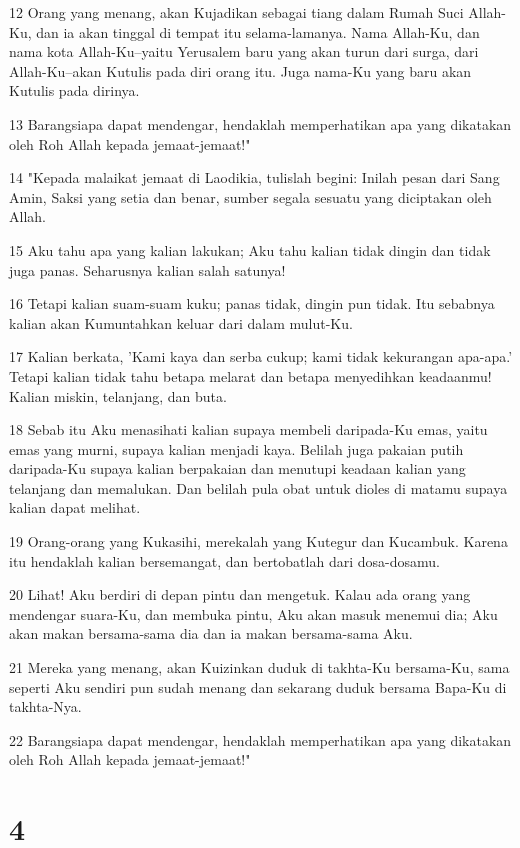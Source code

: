 \par 12 Orang yang menang, akan Kujadikan sebagai tiang dalam Rumah Suci Allah-Ku, dan ia akan tinggal di tempat itu selama-lamanya. Nama Allah-Ku, dan nama kota Allah-Ku--yaitu Yerusalem baru yang akan turun dari surga, dari Allah-Ku--akan Kutulis pada diri orang itu. Juga nama-Ku yang baru akan Kutulis pada dirinya.
\par 13 Barangsiapa dapat mendengar, hendaklah memperhatikan apa yang dikatakan oleh Roh Allah kepada jemaat-jemaat!"
\par 14 "Kepada malaikat jemaat di Laodikia, tulislah begini: Inilah pesan dari Sang Amin, Saksi yang setia dan benar, sumber segala sesuatu yang diciptakan oleh Allah.
\par 15 Aku tahu apa yang kalian lakukan; Aku tahu kalian tidak dingin dan tidak juga panas. Seharusnya kalian salah satunya!
\par 16 Tetapi kalian suam-suam kuku; panas tidak, dingin pun tidak. Itu sebabnya kalian akan Kumuntahkan keluar dari dalam mulut-Ku.
\par 17 Kalian berkata, 'Kami kaya dan serba cukup; kami tidak kekurangan apa-apa.' Tetapi kalian tidak tahu betapa melarat dan betapa menyedihkan keadaanmu! Kalian miskin, telanjang, dan buta.
\par 18 Sebab itu Aku menasihati kalian supaya membeli daripada-Ku emas, yaitu emas yang murni, supaya kalian menjadi kaya. Belilah juga pakaian putih daripada-Ku supaya kalian berpakaian dan menutupi keadaan kalian yang telanjang dan memalukan. Dan belilah pula obat untuk dioles di matamu supaya kalian dapat melihat.
\par 19 Orang-orang yang Kukasihi, merekalah yang Kutegur dan Kucambuk. Karena itu hendaklah kalian bersemangat, dan bertobatlah dari dosa-dosamu.
\par 20 Lihat! Aku berdiri di depan pintu dan mengetuk. Kalau ada orang yang mendengar suara-Ku, dan membuka pintu, Aku akan masuk menemui dia; Aku akan makan bersama-sama dia dan ia makan bersama-sama Aku.
\par 21 Mereka yang menang, akan Kuizinkan duduk di takhta-Ku bersama-Ku, sama seperti Aku sendiri pun sudah menang dan sekarang duduk bersama Bapa-Ku di takhta-Nya.
\par 22 Barangsiapa dapat mendengar, hendaklah memperhatikan apa yang dikatakan oleh Roh Allah kepada jemaat-jemaat!"

\chapter{4}

